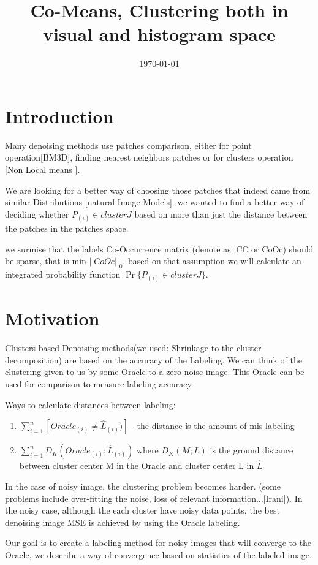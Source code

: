 \documentclass{article}
\title{Co-Means, Clustering both in visual and histogram space}
\author{}
\date{\today}
\begin{document}
\maketitle

\section{Introduction}
Many denoising methods use patches comparison, either for point operation[BM3D], finding nearest neighbors patches or for clusters operation [Non Local means ].

We are looking for a better way of choosing those patches that indeed came from similar Distributions [natural Image Models].
we wanted to find a better way of deciding whether $P_{(i)}\in cluster J$ based on more than just the distance between the patches in the patches space.

we surmise that the labels Co-Occurrence matrix (denote as: CC or CoOc) should be sparse, that is min $||CoOc||_0$. based on that assumption we will calculate an integrated probability function $\Pr \{P_{(i)}\in cluster J\}$.

\section{Motivation}
Clusters based Denoising methods(we used: Shrinkage to the  cluster decomposition) are based on the accuracy of the Labeling.
We can think of the clustering given to us by some Oracle to a zero noise image. This Oracle can be used for comparison to measure labeling accuracy. 

Ways to calculate distances between labeling:
\begin{enumerate}
	\item $ \sum_{i=1}^{n} [Oracle_{(i)}\ne\hat{L}_{(i)})]$  - the distance is the amount of mis-labeling
	\item $ \sum_{i=1}^{n} D_K(Oracle_{(i)};\hat{L}_{(i)}) $ where $ D_K(M;L) $ is the ground distance between cluster center M in the Oracle and cluster center L in $ \hat{L} $
\end{enumerate}

In the case of noisy image, the clustering problem becomes harder. (some problems include over-fitting the noise, loss of relevant information...[Irani]).
In the noisy case, although the each cluster have noisy data points, the best denoising image MSE is achieved by using the Oracle labeling.

Our goal is to create a labeling method for noisy images that will converge to the Oracle, we describe a way of convergence based on statistics of the labeled image.
\end{document}
